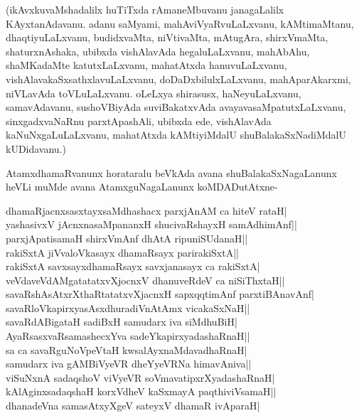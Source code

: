 (ikAvxkuvaMshadalilx huTiTxda rAmaneMbuvanu janagaLalilx KAyxtanAdavanu. adanu saMyami, mahAviVyaRvuLaLxvanu, kAMtimaMtanu, dhaqtiyuLaLxvanu, budidxvaMta, niVtivaMta, mAtugAra, shirxVmaMta, shaturxnAshaka, ubibxda vishAlavAda hegaluLaLxvanu, mahAbAhu, shaMKadaMte katutxLaLxvanu, mahatAtxda hanuvuLaLxvanu, vishAlavakaSxsathxlavuLaLxvanu, doDaDxbilulxLaLxvanu, mahAparAkarxmi, niVLavAda toVLuLaLxvanu. oLeLxya shirasusx, haNeyuLaLxvanu, samavAdavanu, sushoVBiyAda suviBakatxvAda avayavasaMpatutxLaLxvanu, sinxgadxvaNaRnu parxtApashAli, ubibxda ede, vishAlavAda kaNuNxgaLuLaLxvanu, mahatAtxda kAMtiyiMdalU shuBalakaSxNadiMdalU kUDidavanu.) 

AtamxdhamaRvanunx horataralu beVkAda avana shuBalakaSxNagaLanunx heVLi muMde avana AtamxguNagaLanunx koMDADutAtxne- 

\begin{shloka} 
dhamaRjacnxsasxtayxsaMdhashacx parxjAnAM ca hiteV rataH|\label{155}\\ 
yashasivxV jAcnxnasaMpananxH shucivaRshayxH samAdhimAnf||\\ 
parxjApatisamaH shirxVmAnf dhAtA ripuniSUdanaH||\\ 
rakiSxtA jiVvaloVkasayx dhamaRsayx parirakiSxtA||\\ 
rakiSxtA savxsayxdhamaRsayx savxjanasayx ca rakiSxtA|\\ 
veVdaveVdAMgatatatxvXjocnxV dhanuveRdeV ca niSiThxtaH||\\ 
savaRshAsAtxrXthaRtatatxvXjacnxH sapxqqtimAnf parxtiBAnavAnf|\\ 
savaRloVkapirxyasAsxdhuradiVnAtAmx vicakaSxNaH||\\ 
savaRdABigataH sadiBxH samudarx iva siMdhuBiH|\\ 
AyaRsasxvaRsamashecxYva sadeYkapirxyadashaRnaH||\\ 
sa ca savaRguNoVpeVtaH kwsalAyxnaMdavadhaRnaH|\\ 
samudarx iva gAMBiVyeVR dheYyeVRNa himavAniva||\\ 
viSuNxnA sadaqshoV viVyeVR soVmavatipxrXyadashaRnaH|\\ 
kAlAginxsadaqshaH korxVdheV kaSxmayA paqthiviVsamaH||\\ 
dhanadeVna samasAtxyXgeV sateyxV dhamaR ivAparaH|
\end{shloka} 

